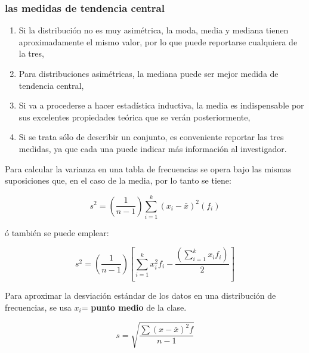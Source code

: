 \subsubsection{las medidas de tendencia central}

\begin{enumerate}
    \item Si la distribución no es muy asimétrica, la moda, media y
          mediana tienen aproximadamente el mismo valor, por lo
          que puede reportarse cualquiera de la tres,
    \item Para distribuciones asimétricas, la mediana puede ser mejor
          medida de tendencia central,
    \item Si va a procederse a hacer estadística inductiva, la media es
          indispensable por sus excelentes propiedades teórica que se
          verán posteriormente,
    \item Si se trata sólo de describir un conjunto, es conveniente
          reportar las tres medidas, ya que cada una puede indicar más
          información al investigador.
\end{enumerate}

Para calcular la varianza en una tabla de
frecuencias se opera bajo las mismas
suposiciones que, en el caso de la media, por
lo tanto se tiene:

\begin{equation}
    s^2=\left(\frac{1}{n-1}\right)\sum_{i=1}^{k}\left(x_i-\bar{x}\right)^2\left(f_i\right)
\end{equation}

ó también se puede emplear:

\begin{equation}
    s^2=\left(\frac{1}{n-1}\right)\left[ \sum_{i=1}^{k}x_i^2f_i-\frac{\left(\sum_{i=1}^{k}x_if_i\right)}{2} \right]
\end{equation}

Para aproximar la desviación estándar de los datos en una distribución de frecuencias, se usa $x_i$= \textbf{punto medio} de la clase.

\begin{equation}
    s=\sqrt{\frac{\sum \left(x-\bar{x}\right)^2f}{n-1}}
\end{equation}

